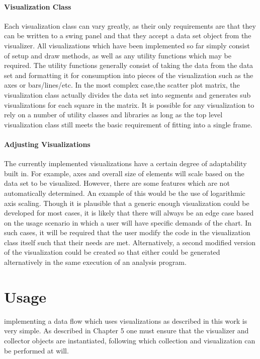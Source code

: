 \paragraph{Visualization Class}
Each visualization class can vary greatly, as their only requirements are that they can be written to a swing panel and that they accept a data set object from the visualizer. All visualizations which have been implemented so far simply consist of setup and draw methods, as well as any utility functions which may be required. The utility functions generally consist of taking the data from the data set and formatting it for consumption into pieces of the visualization such as the axes or bars/lines/etc. In the most complex case,the scatter plot matrix, the visualization class actually divides the data set into segments and generates sub visualizations for each square in the matrix. It is possible for any visualization to rely on a number of utility classes and libraries as long as the top level visualization class still meets the basic requirement of fitting into a single frame. 

\paragraph{Adjusting Visualizations}
The currently implemented visualizations have a certain degree of adaptability built in. For example, axes and overall size of elements will scale based on the data set to be visualized. However, there are some features which are not automatically determined. An example of this would be the use of logarithmic axis scaling. Though it is plausible that a generic enough visualization could be developed for most cases, it is likely that there will always be an edge case based on the usage scenario in which a user will have specific demands of the chart. In such cases, it will be required that the user modify the code in the visualization class itself such that their needs are met. Alternatively, a second modified version of the visualization could be created so that either could be generated alternatively in the same execution of an analysis program. 

\section{Usage}
\label{usage}
 implementing a data flow which uses visualizations as described in this work is very simple. As described in Chapter 5 one must ensure that the visualizer and collector objects are instantiated, following which collection and visualization can be performed at will.

